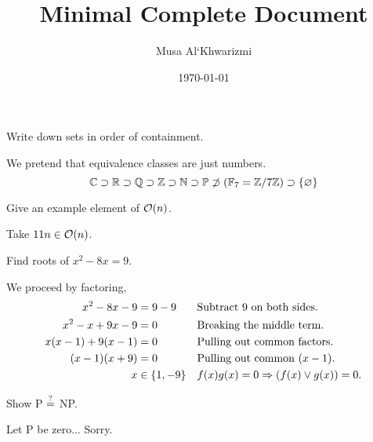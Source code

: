 \documentclass{homework}
\author{Musa Al`Khwarizmi}
\date{\today}
\title{Minimal Complete Document}
\begin{document}
 \maketitle

\question Write down sets in order of containment.

We pretend that equivalence classes are just numbers.
\[
  \C \supset \R \supset \Q \supset \Z \supset \N \supset
  \P \not\supset (\GF[7] = \modulo[7])  \supset \{\nil\}
\]

\question Give an example element of $\O(n)$.

Take $11n \in \O(n)$.

\question Find roots of $x^2- 8x = 9$.

We proceed by factoring,
\begin{align*}
  x^2- 8x - 9         &= 9-9 && \text{Subtract 9 on both sides.}         \\
  x^2- x + 9x - 9     &= 0   && \text{Breaking the middle term.}         \\
  x(x - 1) + 9(x - 1) &= 0   && \text{Pulling out common factors.}       \\
  (x - 1)(x + 9)      &= 0   && \text{Pulling out common } (x - 1).      \\
  x           &\in \{1, -9\} && f(x)g(x) = 0 \Ra (f(x) \vee g(x)) = 0.
\end{align*}

\question Show P $\?$ NP.

Let P be zero... Sorry.
\end{document}

